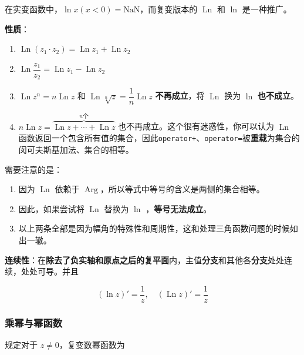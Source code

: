 在实变函数中，\(\ln x(x<0)=\text{NaN}\)，而复变版本的
\(\operatorname{Ln}\) 和 \(\ln\) 是一种推广。

\textbf{性质}：

\begin{enumerate}
\item \(\operatorname{Ln}(z_1 \cdot z_2)=\operatorname{Ln}z_1+\operatorname{Ln}z_2\)
\item \(\operatorname{Ln}\dfrac{z_1}{z_2}=\operatorname{Ln}z_1-\operatorname{Ln}z_2\)
\item \(\operatorname{Ln}z^n=n\operatorname{Ln}z\) 和
\(\operatorname{Ln}\sqrt[n]{z}=\dfrac{1}{n}\operatorname{Ln}z\)
\textbf{不再成立}，将 \(\operatorname{Ln}\) 换为 \(\ln\) \textbf{也不成立}。
\item \(n\operatorname{Ln}z=\overbrace{\operatorname{Ln}z+\cdots+\operatorname{Ln}z}^{n 个}\)
也不再成立。这个很有迷惑性，你可以认为 \(\operatorname{Ln}\)
函数返回一个包含所有值的集合，因此\texttt{operator+}、\texttt{operator=}被\textbf{重载}为集合的闵可夫斯基加法、集合的相等。
\end{enumerate}

\begin{tcolorbox}[title={Note},colback=red!5!white
,colframe=red!75!black
,colbacktitle=yellow!50!red
,coltitle=red!25!black, fonttitle=\bfseries,subtitle style={boxrule=0.4pt, colback=yellow!50!red!25!white}]
需要注意的是：

\begin{enumerate}
\item 因为 \(\operatorname{Ln}\) 依赖于 \(\operatorname{Arg}\)，所以等式中等号的含义是两侧的集合相等。
\item 因此，如果尝试将 \(\operatorname{Ln}\) 替换为 \(\ln\) ，\textbf{等号无法成立}。
\item 以上两条全部是因为幅角的特殊性和周期性，这和处理三角函数问题的时候如出一辙。
\end{enumerate}

\end{tcolorbox}

\textbf{连续性}：在\textbf{除去了负实轴和原点之后的复平面}内，主值\textbf{分支}和其他各\textbf{分支}处处连续，处处可导。并且

\[
(\ln z)'=\frac{1}{z},\quad (\operatorname{Ln}z)'=\frac{1}{z}
\]
\subsubsection{乘幂与幂函数}
\label{乘幂与幂函数}
规定对于 \(z \ne 0\)，复变数幂函数为

